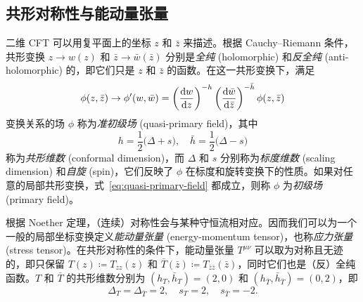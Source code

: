 \subsection{共形对称性与能动量张量}
\label{sec:conformal-symmetry}

二维 CFT 可以用复平面上的坐标 $z$ 和 $\bar{z}$ 来描述。根据 Cauchy--Riemann 条件，共形变换 $z\to w(z)$ 和 $\bar{z}\to\bar{w}(\bar{z})$ 分别是\emph{全纯} (holomorphic) 和\emph{反全纯} (anti-holomorphic) 的，即它们只是 $z$ 和 $\bar{z}$ 的函数。在这一共形变换下，满足
\begin{equation}
  \phi(z,\bar{z}) \to \phi'(w,\bar{w}) =
  \left( \frac{\mathrm{d}w}{\mathrm{d}z} \right)^{-h} \left( \frac{\mathrm{d}\bar{w}}{\mathrm{d}\bar{z}} \right)^{-\bar{h}} \phi(z,\bar{z})
  \label{eq:quasi-primary-field}
\end{equation}
变换关系的场 $\phi$ 称为\emph{准初级场} (quasi-primary field)，其中
\begin{equation}
  h = \frac12 \bigl( \Delta+s \bigr), \quad \bar{h} = \frac12 \bigl( \Delta-s \bigr)
\end{equation}
称为\emph{共形维数} (conformal dimension)，而 $\Delta$ 和 $s$ 分别称为\emph{标度维数} (scaling dimension) 和\emph{自旋} (spin)，它们反映了 $\phi$ 在标度和旋转变换下的性质。如果对任意的局部共形变换，式~\eqref{eq:quasi-primary-field} 都成立，则称 $\phi$ 为\emph{初级场} (primary field)。

根据 Noether 定理，（连续）对称性会与某种守恒流相对应。因而我们可以为一个一般的局部坐标变换定义\emph{能动量张量} (energy-momentum tensor)，也称\emph{应力张量} (stress tensor)。在共形对称性的条件下，能动量张量 $T^{\mu\nu}$ 可以取为对称且无迹的，即只保留 $T(z)\coloneq T_{zz}(z)$ 和 $\bar{T}(\bar{z})\coloneq T_{\bar{z}\bar{z}}(\bar{z})$，同时它们也是（反）全纯函数\cite{ginsparg1988applied,cardy2010conformal,francesco2012conformal}。$T$ 和 $\bar{T}$ 的共形维数分别为 $(h_T,\bar{h}_T)=(2,0)$ 和 $(h_{\bar{T}},\bar{h}_{\bar{T}})=(0,2)$，即
\begin{equation}
  \Delta_T = \Delta_{\bar{T}} = 2, \quad s_T = 2, \quad s_{\bar{T}} = -2.
\end{equation}

